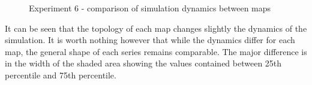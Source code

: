 \begin{figure}[H]
    \centering

    \hspace*{\fill}

    \hspace*{\fill}

    \caption{Experiment 6 - comparison of simulation dynamics between maps}\label{fig:maps_comparison}
\end{figure}

It can be seen that the topology of each map changes slightly the dynamics of the simulation.
It is worth nothing however that while the dynamics differ for each map, the general shape of each series remains comparable.
The major difference is in the width of the shaded area showing the values contained between 25th percentile and 75th percentile.

